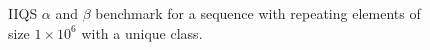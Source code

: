 \begin{figure}


    
    \caption{IIQS $\alpha$ and $\beta$ benchmark for a sequence with repeating elements of size $1\times10^6$ with a unique class.}
    \label{FIG:05_ALPHABETA_RELATIONSHIP_SINGLECLASS}
\end{figure}




